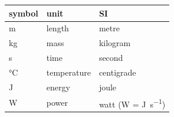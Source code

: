 \documentclass[12pt]{article}
\begin{document}
\renewcommand{\arraystretch}{1.2}
  \noindent \begin{tabular}{l l l} 
    \toprule		
    \textbf{symbol} & \textbf{unit} & \textbf{SI}\\
    \midrule 
    \si{\metre} & length & metre\\
    \si{\kilogram} & mass	& kilogram\\
    \si{\second} & time & second\\
    \si{\celsius} & temperature & centigrade\\
    \si{\joule} & energy & joule\\
    \si{\watt} & power & watt (W = \si{\joule\per\second})\\
    \bottomrule
  \end{tabular}
\end{document}
